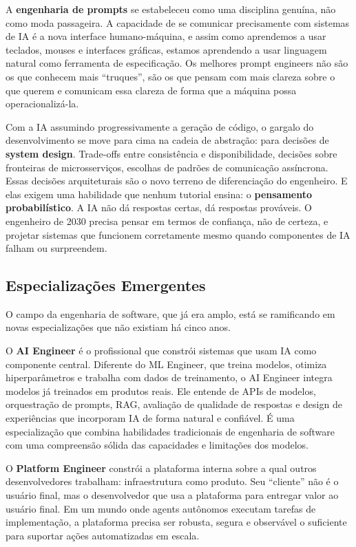 A \textbf{engenharia de prompts} se estabeleceu como uma disciplina genuína, não como moda passageira. A capacidade de se comunicar precisamente com sistemas de IA é a nova interface humano-máquina, e assim como aprendemos a usar teclados, mouses e interfaces gráficas, estamos aprendendo a usar linguagem natural como ferramenta de especificação. Os melhores prompt engineers não são os que conhecem mais ``truques'', são os que pensam com mais clareza sobre o que querem e comunicam essa clareza de forma que a máquina possa operacionalizá-la.

Com a IA assumindo progressivamente a geração de código, o gargalo do desenvolvimento se move para cima na cadeia de abstração: para decisões de \textbf{system design}. Trade-offs entre consistência e disponibilidade, decisões sobre fronteiras de microsserviços, escolhas de padrões de comunicação assíncrona. Essas decisões arquiteturais são o novo terreno de diferenciação do engenheiro. E elas exigem uma habilidade que nenhum tutorial ensina: o \textbf{pensamento probabilístico}. A IA não dá respostas certas, dá respostas prováveis. O engenheiro de 2030 precisa pensar em termos de confiança, não de certeza, e projetar sistemas que funcionem corretamente mesmo quando componentes de IA falham ou surpreendem.

\subsection{Especializações Emergentes}

O campo da engenharia de software, que já era amplo, está se ramificando em novas especializações que não existiam há cinco anos.

O \textbf{AI Engineer} é o profissional que constrói sistemas que usam IA como componente central. Diferente do ML Engineer, que treina modelos, otimiza hiperparâmetros e trabalha com dados de treinamento, o AI Engineer integra modelos já treinados em produtos reais. Ele entende de APIs de modelos, orquestração de prompts, RAG, avaliação de qualidade de respostas e design de experiências que incorporam IA de forma natural e confiável. É uma especialização que combina habilidades tradicionais de engenharia de software com uma compreensão sólida das capacidades e limitações dos modelos.

O \textbf{Platform Engineer} constrói a plataforma interna sobre a qual outros desenvolvedores trabalham: infraestrutura como produto. Seu ``cliente'' não é o usuário final, mas o desenvolvedor que usa a plataforma para entregar valor ao usuário final. Em um mundo onde agents autônomos executam tarefas de implementação, a plataforma precisa ser robusta, segura e observável o suficiente para suportar ações automatizadas em escala.

